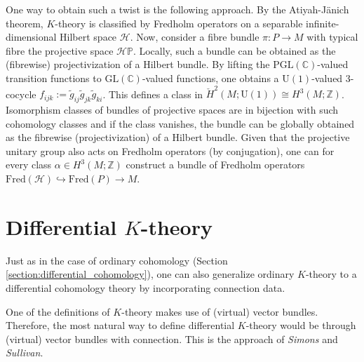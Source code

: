 {    One way to obtain such a twist is the following approach. By the Atiyah-J\"anich theorem, $K$-theory is classified by Fredholm operators on a separable infinite-dimensional Hilbert space $\mathcal{H}$. Now, consider a fibre bundle $\pi:P\rightarrow M$ with typical fibre the projective space $\mathcal{H}\mathbb{P}$. Locally, such a bundle can be obtained as the (fibrewise) projectivization of a Hilbert bundle. By lifting the $\mathrm{PGL}(\mathbb{C})$-valued transition functions to $\mathrm{GL}(\mathbb{C})$-valued functions, one obtains a $\mathrm{U}(1)$-valued 3-cocycle $f_{ijk}:=\widetilde{g}_{ij}\widetilde{g}_{jk}\widetilde{g}_{ki}$. This defines a class in $\check{H}^2(M;\mathrm{U}(1))\cong H^3(M;\mathbb{Z})$. Isomorphism classes of bundles of projective spaces are in bijection with such cohomology classes and if the class vanishes, the bundle can be globally obtained as the fibrewise (projectivization) of a Hilbert bundle. Given that the projective unitary group also acts on Fredholm operators (by conjugation), one can for every class $\alpha\in H^3(M;\mathbb{Z})$ construct a bundle of Fredholm operators $\mathrm{Fred}(\mathcal{H})\hookrightarrow\mathrm{Fred}(P)\rightarrow M$.


\section{\texorpdfstring{Differential $K$-theory}{Differential K-theory}}

    Just as in the case of ordinary cohomology (Section \ref{section:differential_cohomology}), one can also generalize ordinary $K$-theory to a differential cohomology theory by incorporating connection data.

    One of the definitions of $K$-theory makes use of (virtual) vector bundles. Therefore, the most natural way to define differential $K$-theory would be through (virtual) vector bundles with connection. This is the approach of \textit{Simons} and \textit{Sullivan}.

}
